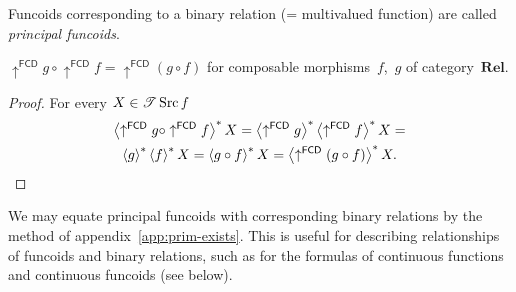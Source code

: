 \begin{defn}
Funcoids corresponding
to a binary relation (= multivalued function) are called \emph{principal
funcoids}.\end{defn}
\begin{prop}
$\uparrow^{\mathsf{FCD}}g\circ\uparrow^{\mathsf{FCD}}f=\uparrow^{\mathsf{FCD}}
(g\circ f)$
for composable morphisms~$f$,~$g$ of category~$\mathbf{Rel}$.\end{prop}
\begin{proof}
For every $X\in\mathscr{T}\operatorname{Src} f$
\begin{multline*}
\left\langle \uparrow^{\mathsf{FCD}}g\circ\uparrow^{\mathsf{FCD}}f\right\rangle ^{\ast}X=\left\langle 
\uparrow^{\mathsf{FCD}}g\right\rangle ^{\ast}\left\langle \uparrow^{\mathsf{FCD}}f\right\rangle ^{\ast}X=\\
\left\langle g\right\rangle ^{\ast}\left\langle f\right\rangle ^{\ast}X=\left\langle g\circ
f\right\rangle ^{\ast}X=\left\langle \uparrow^{\mathsf{FCD}}(g\circ f)\right\rangle ^{\ast}X.
\end{multline*}

\end{proof}
We may equate principal funcoids with corresponding binary relations
by the method of appendix~\ref{app:prim-exists}. This is useful
for describing relationships of funcoids and binary relations, such
as for the formulas of continuous functions and continuous funcoids
(see below).

